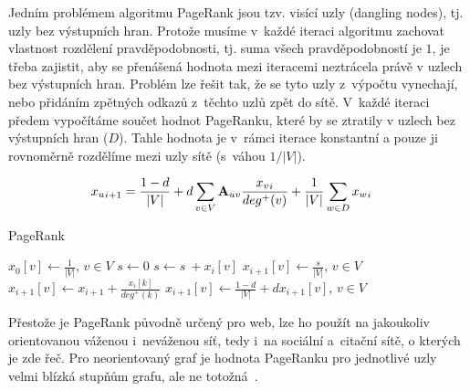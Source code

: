 \documentclass{bakalarka}
\begin{document}
Jedním problémem algoritmu PageRank jsou tzv. visící uzly (dangling nodes), tj.
uzly bez výstupních hran. Protože musíme v~každé iteraci algoritmu zachovat
vlastnost rozdělení pravděpodobnosti, tj. suma všech pravděpodobností je $1$,
je třeba zajistit, aby se přenášená hodnota mezi iteracemi neztrácela právě v
uzlech bez výstupních hran. Problém lze řešit tak, že se tyto uzly z~výpočtu
vynechají, nebo přidáním zpětných odkazů z~těchto uzlů zpět do sítě. V~každé
iteraci předem vypočítáme součet hodnot PageRanku, které by se ztratily v
uzlech bez výstupních hran ($D$). Tahle hodnota je v~rámci iterace konstantní a
pouze ji rovnoměrně rozdělíme mezi uzly sítě (s~váhou $1/|V|$).

\begin{align*}
{x_u}_{i + 1} &= \frac{1 - d}{|V|} + d \displaystyle\sum_{v \in V} {\bf A}_{uv} \frac{{x_v}_i}{deg^+ (v)} + \frac{1}{|V|} \displaystyle\sum_{w \in D} {x_w}_i
\end{align*}


\begin{center}
\begin{minipage}{\textwidth}
\begin{algorithm}[H]
	\caption{PageRank}
		\label{alg:pagerank}

	\begin{algorithmic}[1]
	\Statex
	\State $x_0[v] \gets \frac{1}{|V|}$, $v \in V$
		\State $s \gets 0$
				\State $s \gets s~+ x_{i}[v]$
			\EndIf
		\EndFor
		\State $x_{i + 1}[v] \gets \frac{s}{|V|}$, $v \in V$
				\State $x_{i + 1}[v] \gets x_{i + 1} + \frac{x_i[k]}{deg^+(k)}$
			\EndFor
		\EndFor
		\State $x_{i + 1}[v] \gets \frac{1 - d}{|V|} + d x_{i + 1}[v]$, $v \in V$
	\EndFor
	\end{algorithmic}
\end{algorithm}
\end{minipage}
\end{center}
\mbox{}

Přestože je PageRank původně určený pro web, lze ho použít na jakoukoliv
orientovanou váženou i~neváženou síť, tedy i~na sociální a~citační sítě, o
kterých je zde řeč. Pro neorientovaný graf je hodnota PageRanku pro jednotlivé
uzly velmi blízká stupňům grafu, ale ne totožná~\citep{perrafortunato2008}.
\end{document}
